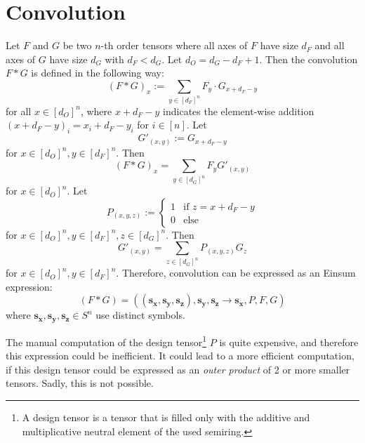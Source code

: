 \section{Convolution}
\label{sec:translating_inference:convolution}

Let $F$ and $G$ be two $n$-th order tensors where all axes of $F$ have size $d_F$ and all axes of $G$ have size $d_G$ with $d_F < d_G$.
Let $d_O = d_G - d_F + 1$.
Then the convolution $F * G$ is defined in the following way:
$$(F * G)_x := \sum\limits_{y \in [d_F]^n} F_y \cdot G_{x + d_F - y}$$
for all $x \in [d_O]^n$, where $x + d_F - y$ indicates the element-wise addition $(x + d_F - y)_i = x_i + d_F - y_i$ for $i \in [n]$.
Let
$$G'_{(x, y)} := G_{x + d_F - y}$$
for $x \in [d_O]^n, y \in [d_F]^n$.
Then
$$(F * G)_x = \sum\limits_{y \in [d_G]^n} F_y G'_{(x, y)}$$
for $x \in [d_O]^n$.
Let
$$P_{(x, y, z)} := \begin{cases}
        1 & \text{if $z = x + d_F - y$} \\
        0 & \text{else}
    \end{cases}$$
for $x \in [d_O]^n, y \in [d_F]^n, z \in [d_G]^n$.
Then
$$G'_{(x, y)} = \sum\limits_{z \in [d_G]^n} P_{(x, y, z)} G_z$$
for $x \in [d_O]^n, y \in [d_F]^n$.
Therefore, convolution can be expressed as an Einsum expression:
$$(F * G) = ((\bm{s_x},\bm{s_y},\bm{s_z}),\bm{s_y}, \bm{s_z}  \rightarrow \bm{s_x}, P, F, G)$$
where $\bm{s_x},\bm{s_y},\bm{s_z} \in S^n$ use distinct symbols.

The manual computation of the design tensor\footnote{A design tensor is a tensor that is filled only with the additive and multiplicative neutral element of the used semiring.} $P$ is quite expensive, and therefore this expression could be inefficient.
It could lead to a more efficient computation, if this design tensor could be expressed as an \textit{outer product} of 2 or more smaller tensors.
Sadly, this is not possible.

